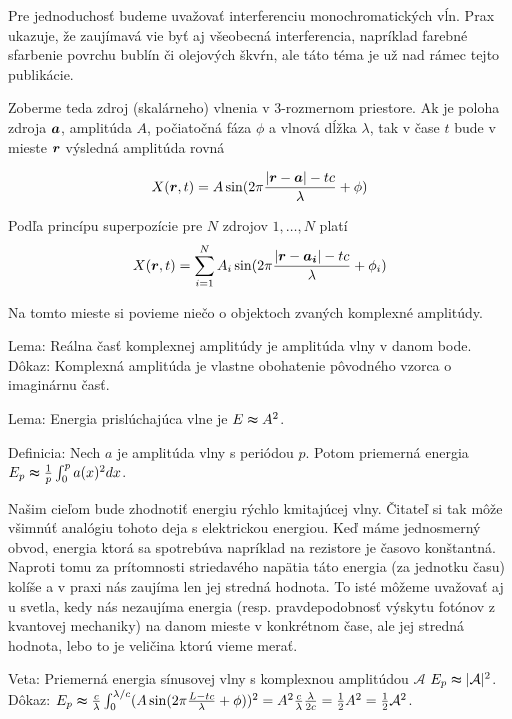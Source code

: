 Pre jednoduchosť budeme uvažovať interferenciu monochromatických vĺn.
Prax ukazuje, že zaujímavá vie byť aj všeobecná interferencia,
napríklad farebné sfarbenie povrchu bublín či olejových škvŕn, ale
táto téma je už nad rámec tejto publikácie.

Zoberme teda zdroj (skalárneho) vlnenia v 3-rozmernom priestore.
Ak je poloha zdroja $\boldsymbol{a}$, amplitúda $A$, počiatočná fáza $\phi$ a vlnová dĺžka
$\lambda$, tak v čase $t$ bude v mieste $\boldsymbol{r}$ výsledná amplitúda rovná

\begin{equation}
X(\boldsymbol{r},t)=A \sin(2 \pi \frac{|\boldsymbol{r}-\boldsymbol{a}| - t c}{\lambda}+\phi)
\end{equation}

Podľa princípu superpozície pre $N$ zdrojov $1,\dots,N$ platí
\begin{equation}
X(\boldsymbol{r},t)=\sum_{i=1}^{N} A_i \sin(2 \pi
\frac{|\boldsymbol{r}-\boldsymbol{a_i}| - t c}{\lambda}+\phi_i)
\end{equation}

Na tomto mieste si povieme niečo o objektoch zvaných komplexné
amplitúdy.



Lema: Reálna časť komplexnej amplitúdy je amplitúda vlny v danom bode.
Dôkaz: Komplexná amplitúda je vlastne obohatenie pôvodného vzorca o
imaginárnu časť.


Lema: Energia prislúchajúca vlne je $E \thickapprox A^2$.

Definicia: Nech $a$ je amplitúda vlny s periódou $p$. 
Potom priemerná energia $E_p \thickapprox \frac{1}{p} \int_0^p a(x)^2 dx$.

\begin{poznamka}
 Našim cieľom bude zhodnotiť energiu rýchlo kmitajúcej vlny.
 Čitateľ si tak môže všimnúť analógiu tohoto deja s elektrickou
 energiou. Keď máme jednosmerný obvod, energia ktorá sa spotrebúva
 napríklad na rezistore je časovo konštantná. Naproti tomu za
 prítomnosti striedavého napätia táto energia (za jednotku času) kolíše
 a v praxi nás zaujíma len jej stredná hodnota. To isté môžeme
 uvažovať aj u svetla, kedy nás nezaujíma energia (resp.
 pravdepodobnosť výskytu fotónov z kvantovej mechaniky) 
 na danom mieste v konkrétnom čase,
 ale jej stredná hodnota, lebo to je veličina ktorú vieme merať.
\end{poznamka}

Veta: Priemerná energia sínusovej vlny s komplexnou amplitúdou
$\mathcal{A}$ $E_p \thickapprox |\mathcal{A}|^2$.
Dôkaz:
$E_p \thickapprox \frac{c}{\lambda} \int_0^{\lambda/c}
(A \sin(2 \pi \frac{L - t c}{\lambda}+\phi))^2
= A^2 \frac{c}{\lambda} \frac{\lambda}{2 c} =
\frac{1}{2} A^2 = \frac{1}{2} \mathcal{A}^2$.

